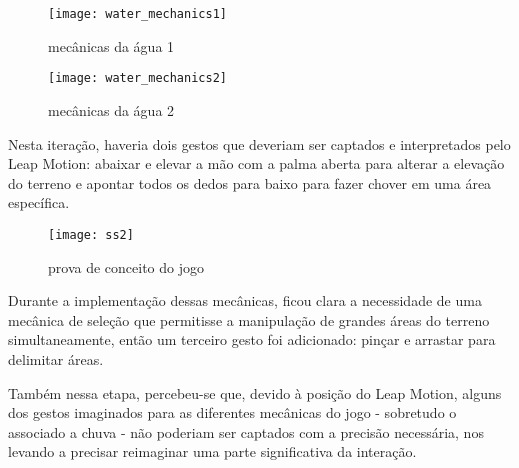 \begin{figure}[h]
	\centering
	\texttt{[image: water\_mechanics1]}
	\caption{mecânicas da água 1}
\end{figure}

\begin{figure}[h]
	\centering
	\texttt{[image: water\_mechanics2]}
	\caption{mecânicas da água 2}
\end{figure}

Nesta iteração, haveria dois gestos que deveriam ser captados e interpretados pelo Leap Motion: abaixar e elevar a mão com a palma aberta para alterar a elevação do terreno e apontar todos os dedos para baixo para fazer chover em uma área específica.

\begin{figure}[h]
	\centering
	\texttt{[image: ss2]}
	\caption{prova de conceito do jogo}
\end{figure}

Durante a implementação dessas mecânicas, ficou clara a necessidade de uma mecânica de seleção que permitisse a manipulação de grandes áreas do terreno simultaneamente, então um terceiro gesto foi adicionado: pinçar e arrastar para delimitar áreas.

Também nessa etapa, percebeu-se que, devido à posição do Leap Motion, alguns dos gestos imaginados para as diferentes mecânicas do jogo - sobretudo o associado a chuva - não poderiam ser captados com a precisão necessária, nos levando a precisar reimaginar uma parte significativa da interação.